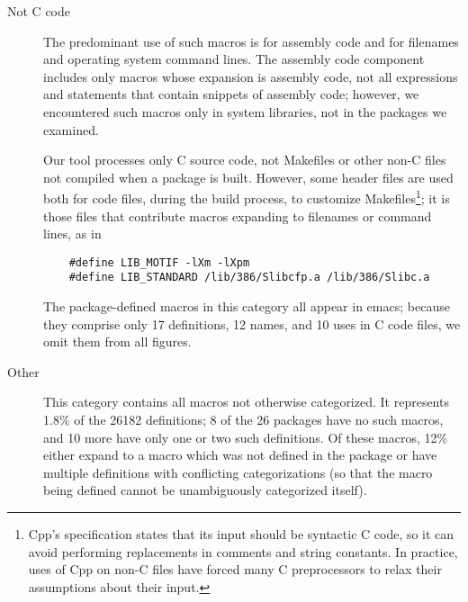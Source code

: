 \documentclass[10pt]{article}
\def\numpackages{26}
\def\nummacrodefs{26182}        %
\newcommand{\pkg}[1]{\textsf{#1}}
\begin{document}
\begin{description}
\item[Not C code]\label{page:not-c-code}
  The predominant use of such macros is for assembly code and for filenames
  and operating system command lines.  The assembly code component includes
  only macros whose expansion is assembly code, not all expressions and
  statements that contain snippets of assembly code; however, we
  encountered such macros only in system libraries, not in the packages we
  examined.  
  
  Our tool processes only C source code, not Makefiles or other non-C files
  not compiled when a package is built.  However, some header files are
  used both for code files, during the build process, to customize
  Makefiles\footnote{Cpp's specification states that its input should be
    syntactic C code, so it can avoid performing replacements in comments
    and string constants.  In practice, uses of Cpp on non-C files have
    forced many C preprocessors to relax their assumptions about their
    input.}; it is those files that contribute macros expanding to
  filenames or command lines, as in
\begin{verbatim}
    #define LIB_MOTIF -lXm -lXpm
    #define LIB_STANDARD /lib/386/Slibcfp.a /lib/386/Slibc.a
\end{verbatim}
  The package-defined macros in this category all appear in \pkg{emacs};
  because they comprise only 17 definitions, 12 names, and 10 uses in C
  code files, we omit them from all figures.
  
\item[Other]
  This category contains all macros not otherwise categorized.  It
  represents 1.8\% of the {\nummacrodefs} definitions; 8 of the
  {\numpackages} packages have no such macros, and 10 more have only one or
  two such definitions.  Of these macros, 12\% either expand to a macro
  which was not defined in the package or have multiple definitions with
  conflicting categorizations (so that the macro being defined cannot be
  unambiguously categorized itself).
  

\end{description}
\end{document}
